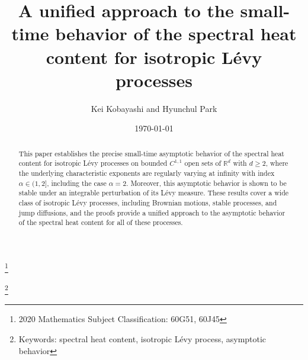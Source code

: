 \documentclass[11pt]{article}
\begin{document}
\begin{doublespace}

\newtheorem{thm}{Theorem}[section]
\newtheorem{lemma}[thm]{Lemma}
\newtheorem{cond}[thm]{Condition}
\newtheorem{defn}[thm]{Definition}
\newtheorem{prop}[thm]{Proposition}
\newtheorem{proposition}[thm]{Proposition}
\newtheorem{corollary}[thm]{Corollary}
\newtheorem{remark}[thm]{Remark}
\newtheorem{example}[thm]{Example}
\newtheorem{conj}[thm]{Conjecture}
\def\ee{\varepsilon}
\def\qed{{\hfill $\Box$ \bigskip}}
\def\NN{{\cal N}}
\def\AA{{\cal A}}
\def\MM{{\cal M}}
\def\BB{{\cal B}}
\def\CC{{\cal C}}
\def\LL{{\cal L}}
\def\DD{{\cal D}}
\def\FF{{\cal F}}
\def\EE{{\cal E}}
\def\QQ{{\cal Q}}
\def\RR{{\mathcal R}}
\def\R{{\mathbb R}}
\def\L{{\mathcal L}}
\def\K{{\bf K}}
\def\S{{\bf S}}
\def\A{{\bf A}}
\def\E{{\mathbb E}}
\def\F{{\bf F}}
\def\P{{\mathbb P}}
\def\N{{\mathbb N}}
\def\eps{\varepsilon}
\def\wh{\widehat}
\def\wt{\widetilde}
\def\pf{\noindent{\bf Proof.} }
\def\beq{\begin{equation}}
\def\eeq{\end{equation}}
\def\lam{\lambda}
\def\H{\mathcal{H}}
\def\nn{\nonumber}
\def\C{\mathbb{C}}
\def\la{\langle}
\def\ra{\rangle}
\def\ud{\mathrm{d}}
\def\hp{\textcolor{blue}}


\newcommand\blfootnote[1]{%
  \begingroup
  \renewcommand\thefootnote{}\footnote{#1}%
  \addtocounter{footnote}{-1}%
  \endgroup
}





\title{\Large \bf  A unified approach to the small-time behavior of the spectral heat content for isotropic L\'evy processes}
\author{Kei Kobayashi and Hyunchul Park}



\date{\today}
\maketitle

\blfootnote{2020 Mathematics Subject Classification: 60G51, 60J45} 
\blfootnote{Keywords: spectral heat content, isotropic L\'evy process, asymptotic behavior}




\begin{abstract}
This paper establishes the precise small-time asymptotic behavior of the spectral heat content for isotropic L\'evy processes on bounded $C^{1,1}$ open sets of $\R^{d}$ with $d\ge 2$, where the underlying characteristic exponents are regularly varying at infinity with index $\alpha\in (1,2]$, including the case $\alpha=2$. 
Moreover, this asymptotic behavior is shown to be stable under an integrable perturbation of its L\'evy measure. 
These results cover a wide class of isotropic L\'evy processes, including Brownian motions, stable processes, and jump diffusions, and the proofs provide a unified approach to the asymptotic behavior of the spectral heat content for all of these processes. 
\end{abstract}




\end{doublespace}
\end{document}
